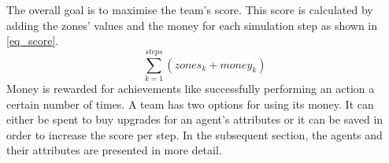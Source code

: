 The overall goal is to maximise the team's score.
This score is calculated by adding the zones' values and the money for each simulation step as shown in \autoref{eq_score}.
\begin{equation}\label{eq_score}
  \sum_{k=1}^\textit{steps}\left(\textit{zones}_k + \textit{money}_k\right)
\end{equation}
Money is rewarded for achievements like successfully performing an action a certain number of times.
A team has two options for using its money.
It can either be spent to buy upgrades for an agent's attributes or it can be saved in order to increase the score per step.
In the subsequent section, the agents and their attributes are presented in more detail.
